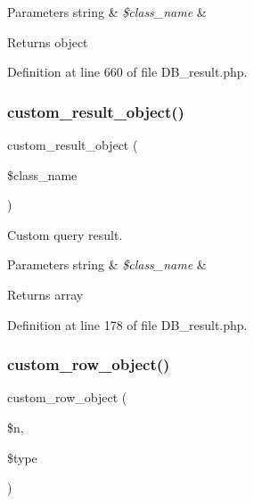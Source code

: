 \begin{DoxyParams}[1]{Parameters}
string & {\em \$class\+\_\+name} & \\
\hline
\end{DoxyParams}
\begin{DoxyReturn}{Returns}
object 
\end{DoxyReturn}


Definition at line 660 of file D\+B\+\_\+result.\+php.

\mbox{\label{class_c_i___d_b__result_a5ac3523f878efb629fae30a7d9156e77}} 
\subsubsection{\texorpdfstring{custom\_result\_object()}{custom\_result\_object()}}
{\footnotesize\ttfamily custom\+\_\+result\+\_\+object (\begin{DoxyParamCaption}\item[{}]{\$class\+\_\+name }\end{DoxyParamCaption})}

Custom query result.


\begin{DoxyParams}[1]{Parameters}
string & {\em \$class\+\_\+name} & \\
\hline
\end{DoxyParams}
\begin{DoxyReturn}{Returns}
array 
\end{DoxyReturn}


Definition at line 178 of file D\+B\+\_\+result.\+php.

\mbox{\label{class_c_i___d_b__result_a223538c34395626655fd483f3a55e653}} 
\subsubsection{\texorpdfstring{custom\_row\_object()}{custom\_row\_object()}}
{\footnotesize\ttfamily custom\+\_\+row\+\_\+object (\begin{DoxyParamCaption}\item[{}]{\$n,  }\item[{}]{\$type }\end{DoxyParamCaption})}

